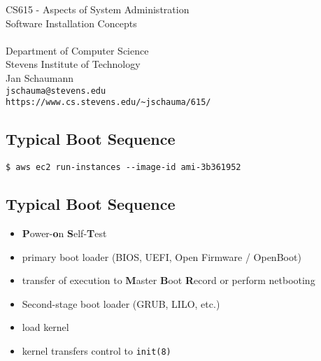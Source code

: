 \documentclass[xga]{xdvislides}
\begin{document}
\setfontphv

\lhead{\slidetitle}                               %
\cfoot{\relax}                               %
\rfoot{\Gray{\today}}

\vspace*{\fill}
\begin{center}
	\Hugesize
		CS615 - Aspects of System Administration\\ [1em]
		Software Installation Concepts \\ [1em]
	\hspace*{5mm}\blueline\\ [1em]
	\Normalsize
		Department of Computer Science\\
		Stevens Institute of Technology\\
		Jan Schaumann\\
		\verb+jschauma@stevens.edu+ \\
		\verb+https://www.cs.stevens.edu/~jschauma/615/+
\end{center}
\vspace*{\fill}

\subsection{Typical Boot Sequence}
\vspace*{\fill}
\begin{verbatim}
$ aws ec2 run-instances --image-id ami-3b361952
\end{verbatim}
\vspace*{\fill}

\subsection{Typical Boot Sequence}
\begin{itemize}
	\item {\bf P}ower-{\bf o}n {\bf S}elf-{\bf T}est
	\item primary boot loader (BIOS, UEFI, Open Firmware / OpenBoot)
	\item transfer of execution to {\bf M}aster {\bf B}oot {\bf R}ecord or perform netbooting
	\item Second-stage boot loader (GRUB, LILO, etc.)
	\item load kernel
	\item kernel transfers control to {\tt init(8)}
\end{itemize}
\end{document}
